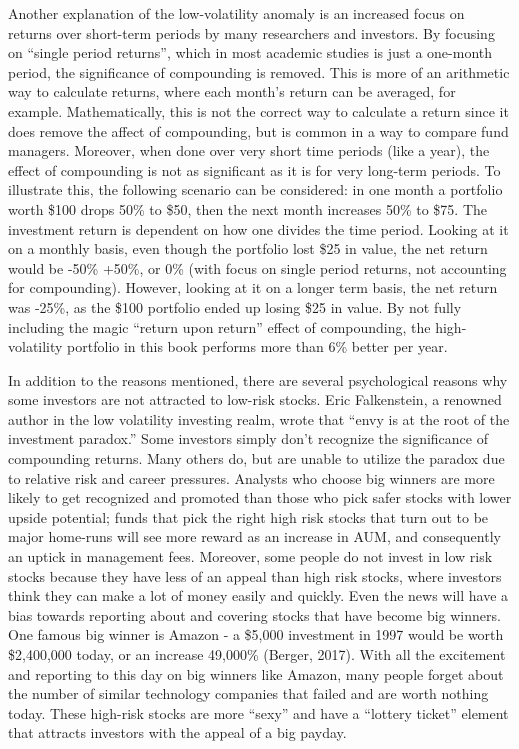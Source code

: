 \documentclass[12pt,twoside]{reedthesis}
\theoremstyle{definition}
\theoremstyle{definition}
\theoremstyle{definition}
\theoremstyle{remark}
\begin{document}
Another explanation of the low-volatility anomaly is an increased focus
on returns over short-term periods by many researchers and investors. By
focusing on ``single period returns'', which in most academic studies is
just a one-month period, the significance of compounding is removed.
This is more of an arithmetic way to calculate returns, where each
month's return can be averaged, for example. Mathematically, this is not
the correct way to calculate a return since it does remove the affect of
compounding, but is common in a way to compare fund managers. Moreover,
when done over very short time periods (like a year), the effect of
compounding is not as significant as it is for very long-term periods.
To illustrate this, the following scenario can be considered: in one
month a portfolio worth \$100 drops 50\% to \$50, then the next month
increases 50\% to \$75. The investment return is dependent on how one
divides the time period. Looking at it on a monthly basis, even though
the portfolio lost \$25 in value, the net return would be -50\% +50\%,
or 0\% (with focus on single period returns, not accounting for
compounding). However, looking at it on a longer term basis, the net
return was -25\%, as the \$100 portfolio ended up losing \$25 in value.
By not fully including the magic ``return upon return'' effect of
compounding, the high-volatility portfolio in this book performs more
than 6\% better per year.

In addition to the reasons mentioned, there are several psychological
reasons why some investors are not attracted to low-risk stocks. Eric
Falkenstein, a renowned author in the low volatility investing realm,
wrote that ``envy is at the root of the investment paradox.'' Some
investors simply don't recognize the significance of compounding
returns. Many others do, but are unable to utilize the paradox due to
relative risk and career pressures. Analysts who choose big winners are
more likely to get recognized and promoted than those who pick safer
stocks with lower upside potential; funds that pick the right high risk
stocks that turn out to be major home-runs will see more reward as an
increase in AUM, and consequently an uptick in management fees.
Moreover, some people do not invest in low risk stocks because they have
less of an appeal than high risk stocks, where investors think they can
make a lot of money easily and quickly. Even the news will have a bias
towards reporting about and covering stocks that have become big
winners. One famous big winner is Amazon - a \$5,000 investment in 1997
would be worth \$2,400,000 today, or an increase 49,000\% (Berger,
2017). With all the excitement and reporting to this day on big winners
like Amazon, many people forget about the number of similar technology
companies that failed and are worth nothing today. These high-risk
stocks are more ``sexy'' and have a ``lottery ticket'' element that
attracts investors with the appeal of a big payday.
\end{document}
